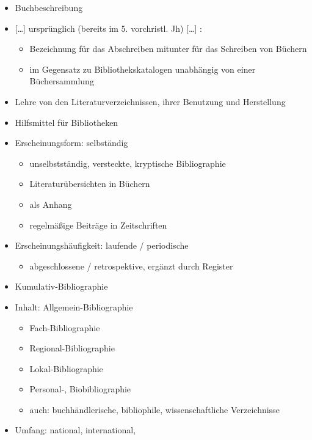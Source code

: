 \documentclass[a4paper,
fontsize=11pt,
oneside,
numbers=noperiodatend,
parskip=half-,
bibliography=totoc,
final
]{scrartcl}
\providecommand{\tightlist}{%
  \setlength{\itemsep}{0pt}\setlength{\parskip}{0pt}}
\begin{document}
\begin{itemize}
\item
  Buchbeschreibung
\item
  {[}\ldots{}{]} ursprünglich (bereits im 5. vorchristl. Jh)
  {[}\ldots{}{]} :

  \begin{itemize}
  \item
    Bezeichnung für das Abschreiben mitunter für das Schreiben von
    Büchern
  \item
    im Gegensatz zu Bibliothekskatalogen unabhängig von einer
    Büchersammlung
  \end{itemize}
\item
  Lehre von den Literaturverzeichnissen, ihrer Benutzung und Herstellung
\item
  Hilfsmittel für Bibliotheken
\item
  Erscheinungsform: selbständig

  \begin{itemize}
  \item
    unselbstständig, versteckte, kryptische Bibliographie
  \item
    Literaturübersichten in Büchern
  \item
    als Anhang
  \item
    regelmäßige Beiträge in Zeitschriften
  \end{itemize}
\item
  Erscheinungshäufigkeit: laufende / periodische

  \begin{itemize}
  \tightlist
  \item
    abgeschlossene / retrospektive, ergänzt durch Register
  \end{itemize}
\item
  Kumulativ-Bibliographie
\item
  Inhalt: Allgemein-Bibliographie

  \begin{itemize}
  \item
    Fach-Bibliographie
  \item
    Regional-Bibliographie
  \item
    Lokal-Bibliographie
  \item
    Personal-, Biobibliographie
  \item
    auch: buchhändlerische, bibliophile, wissenschaftliche Verzeichnisse
  \end{itemize}
\item
  Umfang: national, international,


\end{itemize}
\end{document}
